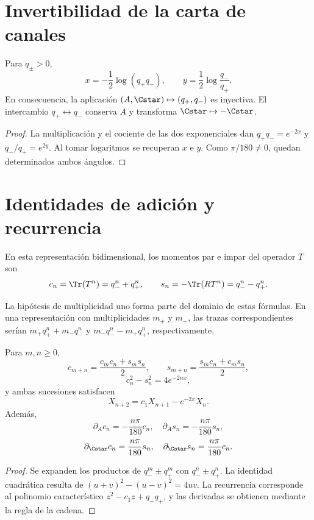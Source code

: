 \section{Invertibilidad de la carta de canales}

\begin{theorem}
Para \(q_\pm>0\),
\[
 x=-\frac12\log(q_+q_-),
 \qquad
 y=\frac12\log\frac{q_-}{q_+}.
\]
En consecuencia, la aplicación
\((A,\Cstar)\mapsto(q_+,q_-)\) es inyectiva. El intercambio
\(q_+\leftrightarrow q_-\) conserva \(A\) y transforma
\(\Cstar\mapsto-\Cstar\).
\end{theorem}
\begin{proof}
La multiplicación y el cociente de las dos exponenciales dan
\(q_+q_-=e^{-2x}\) y \(q_-/q_+=e^{2y}\). Al tomar logaritmos se recuperan
\(x\) e \(y\). Como \(\pi/180\neq0\), quedan determinados ambos ángulos.
\end{proof}

\section{Identidades de adición y recurrencia}

En esta representación bidimensional, los momentos par e impar del operador
\(T\) son
\[
 c_n=\Tr(T^n)=q_-^n+q_+^n,
 \qquad
 s_n=-\Tr(RT^n)=q_-^n-q_+^n.
\]

La hipótesis de multiplicidad uno forma parte del dominio de estas fórmulas.
En una representación con multiplicidades \(m_+\) y \(m_-\), las trazas
correspondientes serían
\(m_+q_+^n+m_-q_-^n\) y
\(m_-q_-^n-m_+q_+^n\), respectivamente.

\begin{theorem}
Para \(m,n\geq0\),
\[
 c_{m+n}=\frac{c_mc_n+s_ms_n}{2},
 \qquad
 s_{m+n}=\frac{s_mc_n+c_ms_n}{2},
\]
\[
 c_n^2-s_n^2=4e^{-2nx},
\]
y ambas sucesiones satisfacen
\[
 X_{n+2}=c_1X_{n+1}-e^{-2x}X_n.
\]
Además,
\[
 \partial_Ac_n=-\frac{n\pi}{180}c_n,
 \quad
 \partial_As_n=-\frac{n\pi}{180}s_n,
\]
\[
 \partial_{\Cstar}c_n=\frac{n\pi}{180}s_n,
 \quad
 \partial_{\Cstar}s_n=\frac{n\pi}{180}c_n.
\]
\end{theorem}
\begin{proof}
Se expanden los productos de
\(q_-^m\pm q_+^m\) con \(q_-^n\pm q_+^n\). La identidad cuadrática resulta
de \((u+v)^2-(u-v)^2=4uv\). La recurrencia corresponde al polinomio
característico \(z^2-c_1z+q_-q_+\), y las derivadas se obtienen mediante la
regla de la cadena.
\end{proof}

